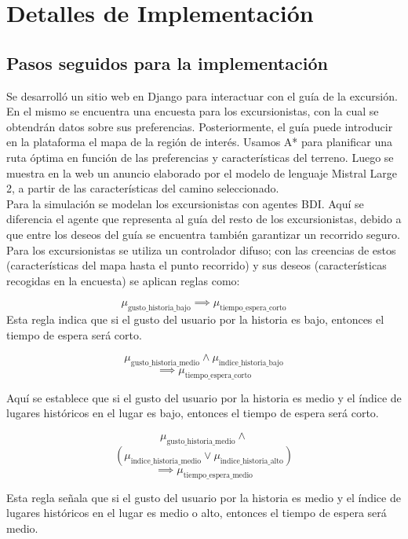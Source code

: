 \documentclass[10pt,twocolumn]{article}
\begin{document}
	\section{Detalles de Implementación}
	
	\subsection{Pasos seguidos para la implementación}
	Se desarrolló un sitio web en Django para interactuar con el guía de la excursión. En el mismo se encuentra una encuesta para los excursionistas, con la cual se obtendrán datos sobre sus preferencias. Posteriormente, el guía puede introducir en la plataforma el mapa de la región de interés. Usamos A* para planificar una ruta óptima en función de las preferencias y características del terreno. Luego se muestra en la web un anuncio elaborado por el modelo de lenguaje Mistral Large 2, a partir de las características del camino seleccionado.\\
	Para la simulación se modelan los excursionistas con agentes BDI. Aquí se diferencia el agente que representa al guía del resto de los excursionistas, debido a que entre los deseos del guía se encuentra también garantizar un recorrido seguro. Para los excursionistas se utiliza un controlador difuso; con las creencias de estos (características del mapa hasta el punto recorrido) y sus deseos (características recogidas en la encuesta) se aplican reglas como:
	
	$$
	 \mu_{\text{gusto\_historia\_bajo}} \implies \mu_{\text{tiempo\_espera\_corto}}
	$$
	Esta regla indica que si el gusto del usuario por la historia es bajo, entonces el tiempo de espera será corto.
	
	$$
	\mu_{\text{gusto\_historia\_medio}} \land \mu_{\text{indice\_historia\_bajo}}$$
	$$\implies \mu_{\text{tiempo\_espera\_corto}}$$
	
	
	Aquí se establece que si el gusto del usuario por la historia es medio y el índice de lugares históricos en el lugar es bajo, entonces el tiempo de espera será corto.
	
	$$
		\mu_{\text{gusto\_historia\_medio}}  \land $$
		 $$ \left( \mu_{\text{indice\_historia\_medio}}	
		 \lor \mu_{\text{indice\_historia\_alto}} \right)$$
		$$\implies \mu_{\text{tiempo\_espera\_medio}}$$

	Esta regla señala que si el gusto del usuario por la historia es medio y el índice de lugares históricos en el lugar es medio o alto, entonces el tiempo de espera será medio.
	
\end{document}
